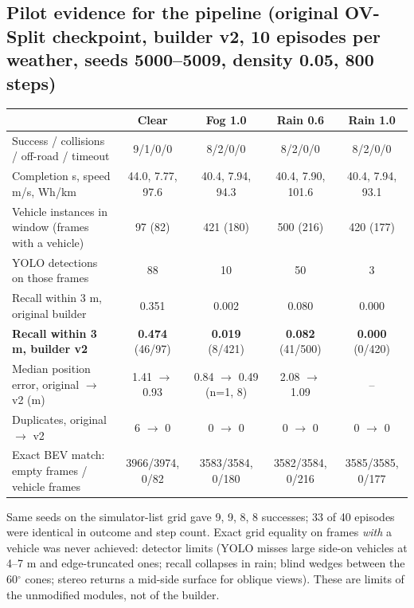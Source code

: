 \documentclass[11pt,a4paper]{article}
\begin{document}
\subsection{Pilot evidence for the pipeline (original OV-Split checkpoint, builder v2, 10 episodes per weather, seeds 5000--5009, density 0.05, 800 steps)}
\begin{center}\footnotesize\setlength{\tabcolsep}{3pt}\begin{tabular}{@{}p{4.9cm}cccc@{}}\toprule
 & Clear & Fog 1.0 & Rain 0.6 & Rain 1.0\\\midrule
Success / collisions / off-road / timeout & 9/1/0/0 & 8/2/0/0 & 8/2/0/0 & 8/2/0/0\\
Completion s, speed m/s, Wh/km & 44.0, 7.77, 97.6 & 40.4, 7.94, 94.3 & 40.4, 7.90, 101.6 & 40.4, 7.94, 93.1\\
Vehicle instances in window (frames with a vehicle) & 97 (82) & 421 (180) & 500 (216) & 420 (177)\\
YOLO detections on those frames & 88 & 10 & 50 & 3\\
Recall within 3 m, original builder & 0.351 & 0.002 & 0.080 & 0.000\\
\textbf{Recall within 3 m, builder v2} & \textbf{0.474} (46/97) & \textbf{0.019} (8/421) & \textbf{0.082} (41/500) & \textbf{0.000} (0/420)\\
Median position error, original $\to$ v2 (m) & 1.41 $\to$ 0.93 & 0.84 $\to$ 0.49 (n=1, 8) & 2.08 $\to$ 1.09 & --\\
Duplicates, original $\to$ v2 & 6 $\to$ 0 & 0 $\to$ 0 & 0 $\to$ 0 & 0 $\to$ 0\\
Exact BEV match: empty frames / vehicle frames & 3966/3974, 0/82 & 3583/3584, 0/180 & 3582/3584, 0/216 & 3585/3585, 0/177\\\bottomrule\end{tabular}\end{center}
Same seeds on the simulator-list grid gave 9, 9, 8, 8 successes; 33 of 40 episodes were identical in outcome and step count. Exact grid equality on frames \emph{with} a vehicle was never achieved: detector limits (YOLO misses large side-on vehicles at 4--7 m and edge-truncated ones; recall collapses in rain; blind wedges between the 60$^\circ$ cones; stereo returns a mid-side surface for oblique views). These are limits of the unmodified modules, not of the builder.
\end{document}
